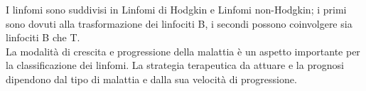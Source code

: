 I linfomi sono suddivisi in Linfomi di Hodgkin e Linfomi non-Hodgkin; 
i primi sono dovuti alla trasformazione dei linfociti B, i secondi possono coinvolgere sia linfociti B che T.\\ 
La modalità di crescita e progressione della malattia è un aspetto importante per la classificazione dei linfomi.
La strategia terapeutica da attuare e la prognosi dipendono dal tipo di malattia e dalla sua velocità di 
progressione\cite{LINFOMIAIL}.\\





